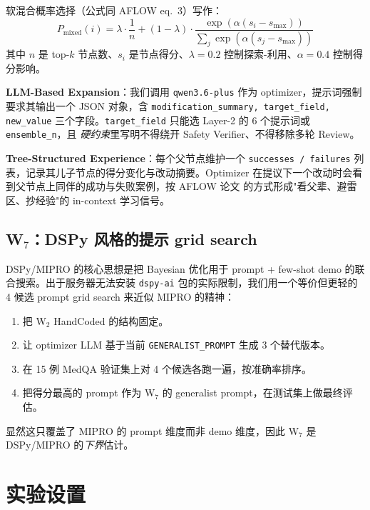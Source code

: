 \documentclass[11pt,a4paper]{ctexart}
\begin{document}
软混合概率选择（公式同 AFLOW \cite{aflow2024} eq.~3）写作：
\begin{equation}
P_{\mathrm{mixed}}(i) = \lambda \cdot \frac{1}{n} + (1 - \lambda) \cdot \frac{\exp(\alpha (s_i - s_{\max}))}{\sum_j \exp(\alpha (s_j - s_{\max}))}
\label{eq:softmixed}
\end{equation}
其中 $n$ 是 top-$k$ 节点数、$s_i$ 是节点得分、$\lambda=0.2$ 控制探索-利用、$\alpha=0.4$ 控制得分影响。

\textbf{LLM-Based Expansion}：我们调用 \texttt{qwen3.6-plus} 作为 optimizer，提示词强制要求其输出一个 JSON 对象，含 \texttt{modification\_summary, target\_field, new\_value} 三个字段。\texttt{target\_field} 只能选 Layer-2 的 6 个提示词或 \texttt{ensemble\_n}，且 \emph{硬约束}里写明不得绕开 Safety Verifier、不得移除多轮 Review。

\textbf{Tree-Structured Experience}：每个父节点维护一个 \texttt{successes / failures} 列表，记录其儿子节点的得分变化与改动摘要。Optimizer 在提议下一个改动时会看到父节点上同伴的成功与失败案例，按 AFLOW 论文 \cite{aflow2024} 的方式形成"看父辈、避雷区、抄经验"的 in-context 学习信号。

\subsection{W$_7$：DSPy 风格的提示 grid search}
\label{sec:method-dspy}

DSPy/MIPRO \cite{dspy2024} 的核心思想是把 Bayesian 优化用于 prompt + few-shot demo 的联合搜索。出于服务器无法安装 \texttt{dspy-ai} 包的实际限制，我们用一个等价但更轻的 4 候选 prompt grid search 来近似 MIPRO 的精神：

\begin{enumerate}
    \item 把 W$_2$ HandCoded 的结构固定。
    \item 让 optimizer LLM 基于当前 \texttt{GENERALIST\_PROMPT} 生成 3 个替代版本。
    \item 在 15 例 MedQA 验证集上对 4 个候选各跑一遍，按准确率排序。
    \item 把得分最高的 prompt 作为 W$_7$ 的 generalist prompt，在测试集上做最终评估。
\end{enumerate}

显然这只覆盖了 MIPRO 的 prompt 维度而非 demo 维度，因此 W$_7$ 是 DSPy/MIPRO 的\emph{下界}估计。

\section{实验设置}
\label{sec:setup}
\end{document}
